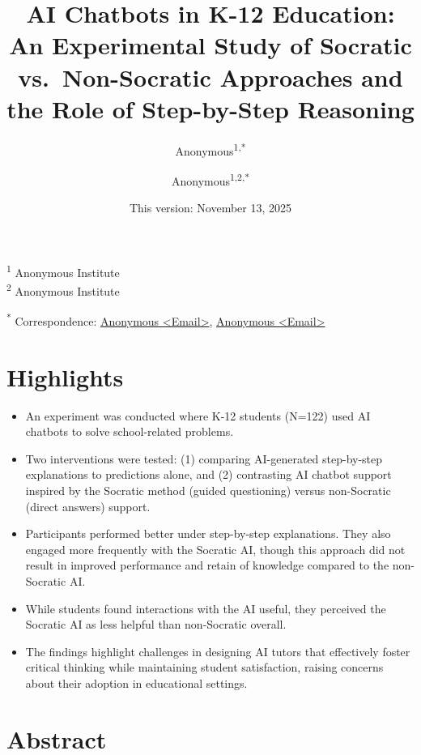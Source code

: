 \documentclass[
  12pt,
]{article}
\title{AI Chatbots in K-12 Education: An Experimental Study of Socratic vs.~Non-Socratic Approaches and the Role of Step-by-Step Reasoning}
\author{Anonymous\textsuperscript{1,*} \and Anonymous\textsuperscript{1,2,*}}
\date{This version: November 13, 2025}
\begin{document}
\maketitle

\textsuperscript{1} Anonymous Institute\\
\textsuperscript{2} Anonymous Institute

\textsuperscript{*} Correspondence: \href{mailto:Email}{Anonymous \textless{}Email\textgreater{}}, \href{mailto:Email}{Anonymous \textless{}Email\textgreater{}}

\section*{Highlights}\label{highlights}

\begin{itemize}
\item
  An experiment was conducted where K-12 students (N=122) used AI chatbots to solve school-related problems.
\item
  Two interventions were tested: (1) comparing AI-generated step-by-step explanations to predictions alone, and (2) contrasting AI chatbot support inspired by the Socratic method (guided questioning) versus non-Socratic (direct answers) support.
\end{itemize}

\begin{itemize}
\item
  Participants performed better under step-by-step explanations. They also engaged more frequently with the Socratic AI, though this approach did not result in improved performance and retain of knowledge compared to the non-Socratic AI.
\item
  While students found interactions with the AI useful, they perceived the Socratic AI as less helpful than non-Socratic overall.
\item
  The findings highlight challenges in designing AI tutors that effectively foster critical thinking while maintaining student satisfaction, raising concerns about their adoption in educational settings.
\end{itemize}

\section*{Abstract}\label{abstract}
\end{document}

